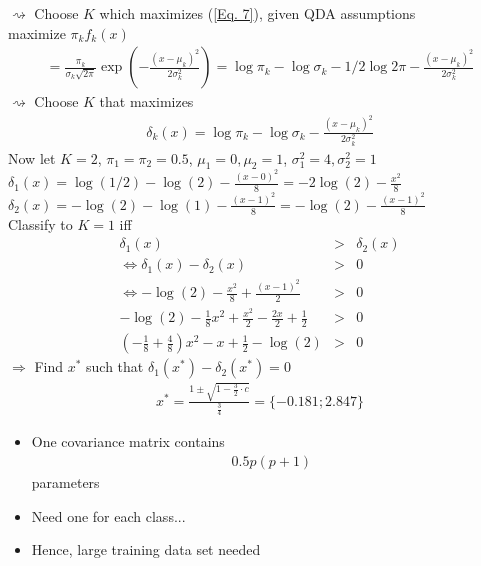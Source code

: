 \documentclass[11pt,a4paper,numbers=endperiod]{scrartcl}
\newcommand{\tit}[1]{\begin{large} \underline{\text{#1}}\end{large}}
\begin{document}
{$\rightsquigarrow$ Choose $K$ which maximizes (\ref*{Eq. 7}), given QDA assumptions\\
maximize $\pi_k f_k(x)$ \begin{align*}
	= \frac{\pi_k}{\sigma_k \sqrt{2 \pi}} \exp \left(- \frac{(x- \mu_k)^2}{2 \sigma_k^2}\right) = \log \pi_k - \log \sigma_k - 1/2 \log 2\pi - \frac{(x-\mu_k)^2}{2 \sigma_k^2}
\end{align*}
$\rightsquigarrow$ Choose $K$ that maximizes \begin{align*}
	\delta_k(x) = \log \pi_k - \log \sigma_k - \frac{(x - \mu_k)^2}{2 \sigma_k^2}
\end{align*}
Now let $K = 2$, $\pi_1 = \pi_2 = 0.5$, $\mu_1 = 0, \mu_2= 1$, $\sigma_1^2 = 4, \sigma_2^2 = 1$\\

$\delta_1 (x) = \log(1/2) - \log(2) - \frac{(x-0)^2}{8} = - 2 \log(2) - \frac{x^2}{8}$\\
$\delta_2 (x) = - \log(2) - \log(1) - \frac{(x-1)^2}{8} = -\log(2) - \frac{(x-1)^2}{8} $\\

Classify to $K = 1$ iff
\begin{eqnarray*}
	\delta_1(x) &>& \delta_2(x)\\ \Leftrightarrow \delta_1(x) - \delta_2(x) &>& 0\\ \Leftrightarrow - \log(2) - \frac{x^2}{8} + \frac{(x-1)^2}{2} &>& 0\\
	- \log(2) - \frac{1}{8} x^2 + \frac{x^2}{2} - \frac{2x}{2} + \frac{1}{2} &>& 0\\
	(- \frac{1}{8} + \frac{4}{8}) x^2 - x + \frac{1}{2} - \log(2) &>& 0
\end{eqnarray*}  
$\Rightarrow$ Find $x^*$ such that $\delta_1(x^*) - \delta_2(x^*) = 0$ 
\begin{align*}
	x^* = \frac{1 \pm \sqrt{1 - \frac{3}{2} \cdot c}}{\frac{3}{4}} = \{-0.181; 2.847\} 
\end{align*}

\tit{QDA when $p$ is large}
\begin{itemize}
	\item One covariance matrix contains \begin{align*}
		0.5p (p+1)
	\end{align*}
	parameters
	\item Need one for each class...
	\item Hence, large training data set needed
\end{itemize}

}
\end{document}
